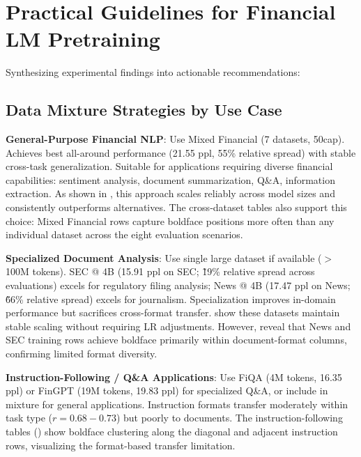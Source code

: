 \section{Practical Guidelines for Financial LM Pretraining}

Synthesizing experimental findings into actionable recommendations:

\subsection{Data Mixture Strategies by Use Case}

\textbf{General-Purpose Financial NLP}: Use Mixed Financial (7 datasets, 50cap). Achieves best all-around performance (21.55 ppl, 55\% relative spread) with stable cross-task generalization. Suitable for applications requiring diverse financial capabilities: sentiment analysis, document summarization, Q\&A, information extraction. As shown in , this approach scales reliably across model sizes and consistently outperforms alternatives. The cross‑dataset tables also support this choice: Mixed Financial rows capture boldface positions more often than any individual dataset across the eight evaluation scenarios.

\textbf{Specialized Document Analysis}: Use single large dataset if available ($>$ 100M tokens). SEC @ 4B (15.91 ppl on SEC; \~19\% relative spread across evaluations) excels for regulatory filing analysis; News @ 4B (17.47 ppl on News; \~66\% relative spread) excels for journalism. Specialization improves in-domain performance but sacrifices cross-format transfer.  show these datasets maintain stable scaling without requiring LR adjustments. However,  reveal that News and SEC training rows achieve boldface primarily within document-format columns, confirming limited format diversity.

\textbf{Instruction-Following / Q\&A Applications}: Use FiQA (4M tokens, 16.35 ppl) or FinGPT (19M tokens, 19.83 ppl) for specialized Q\&A, or include in mixture for general applications. Instruction formats transfer moderately within task type ($r = 0.68-0.73$) but poorly to documents. The instruction-following tables () show boldface clustering along the diagonal and adjacent instruction rows, visualizing the format-based transfer limitation.

